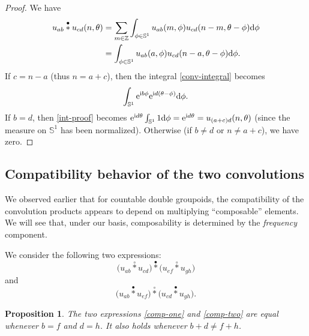 \documentclass[pdftex]{sigma}
\numberwithin{equation}{section}
\newtheorem{Proposition}[Theorem]{Proposition}
\theoremstyle{definition}
\newcommand{\BBZ}{\mathbb{Z}}
\newcommand{\BBS}{\mathbb{S}}
\newcommand{\stardot}{\overset{{\bullet}}{*}}
\newcommand{\starcirc}{\overset{\circ}{*}}
\begin{document}
\begin{proof}
We have
\begin{align}
  \notag u_{ab}\stardot u_{cd}(n,\theta) & = \sum_{m\in\BBZ} \int_{\phi\in \BBS^1} u_{ab}(m,\phi)u_{cd}(n-m,\theta-\phi){\rm d}\phi\\
  & \label{conv-integral} = \int_{\phi\in\BBS^1} u_{ab}(a,\phi)u_{cd}(n-a,\theta-\phi){\rm d}\phi.
\end{align}
If $c=n-a$ (thus $n=a+c$), then the integral \eqref{conv-integral} becomes
\begin{equation}\label{int-proof}
 \int_{\BBS^1} {\rm e}^{{\rm i} b\phi}{\rm e}^{{\rm i} d(\theta-\phi)}{\rm d}\phi.
 \end{equation}
 If $b=d$, then \eqref{int-proof} becomes
$ {\rm e}^{{\rm i} d\theta} \int_{\BBS^1} 1 {\rm d}\phi
= {\rm e}^{{\rm i} d\theta}
= u_{(a+c)d}(n,\theta)
$
(since the measure on $\BBS^1$ has been normalized). Otherwise (if $b\neq d$ or $n\neq a+c$), we have zero.
\end{proof}

\subsection{Compatibility behavior of the two convolutions}
We observed earlier that for countable double groupoids, the compatibility of the convolution products appears to depend on multiplying ``composable'' elements. We will see that, under our basis, composability is determined by the \emph{frequency} component.

We consider the following two expressions:
\begin{equation}\label{comp-one}
\big(u_{ab}\starcirc u_{cd}\big)\stardot\big(u_{ef}\starcirc u_{gh}\big)
\end{equation}
and
\begin{equation}\label{comp-two}
\big(u_{ab}\stardot u_{ef}\big)\starcirc\big(u_{cd}\stardot u_{gh}\big).
\end{equation}

\begin{Proposition} The two expressions \eqref{comp-one} and \eqref{comp-two} are equal whenever $b=f$ and $d=h$. It also holds whenever $b+d\neq f+h$.
\end{Proposition}
\end{document}
